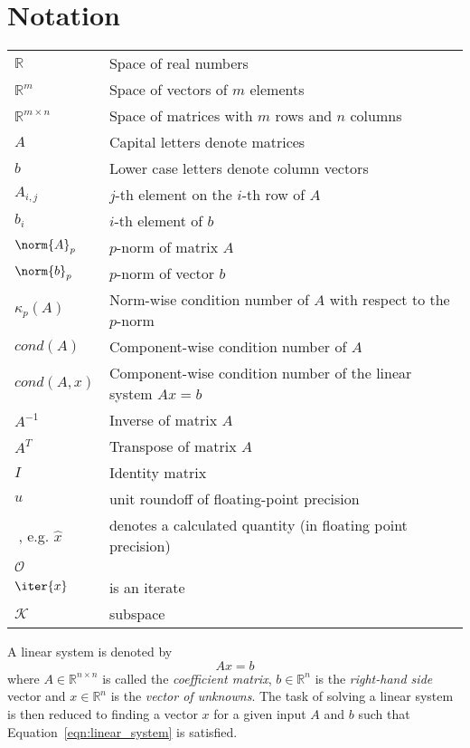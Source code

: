 \section{Notation}
\label{sec:notation}


\begin{tabular}{ll}
  $\mathbb{R}$ & Space of real numbers \\
  $\mathbb{R}^{m}$ & Space of vectors of $m$ elements \\
  $\mathbb{R}^{m \times n}$ & Space of matrices with $m$ rows and $n$ columns \\
  $A$ & Capital letters denote matrices \\
  $b$ & Lower case letters denote column vectors \\
  $A_{i,j}$ & $j$-th element on the $i$-th row of $A$ \\
  $b_{i}$ & $i$-th element of $b$ \\
  $\norm{A}_p$ & $p$-norm of matrix $A$ \\
  $\norm{b}_p$ & $p$-norm of vector $b$ \\
  $\kappa_{p}(A)$ & Norm-wise condition number of $A$ with respect to the $p$-norm \\
  $cond(A)$ & Component-wise condition number of $A$ \\
  $cond(A, x)$ & Component-wise condition number of the linear system $Ax=b$ \\
  $A^{-1}$ & Inverse of matrix $A$ \\
  $A^T$    & Transpose of matrix $A$ \\
  $I$      & Identity matrix  \\
  $u$      & unit roundoff of floating-point precision \\
  $\hat{}\;$, e.g. $\hat{x}$ & denotes a calculated quantity (in floating point precision) \\
  $\mathcal{O}$ & \\
  $\iter{x}$ & is an iterate \\
  $\mathcal{K}$ & subspace \\
\end{tabular}
\vspace{0.5cm}

\noindent A linear system is denoted by
\begin{equation}
\label{eqn:linear_system}
    Ax=b
\end{equation}
\noindent where $A \in \mathbb{R}^{n \times n}$ is called the \textit{coefficient matrix}, $b \in \mathbb{R}^{n}$ is the \textit{right-hand side} vector and $x \in \mathbb{R}^{n}$ is the \textit{vector of unknowns}. The task of solving a linear system is then reduced to finding a vector $x$ for a given input $A$ and $b$ such that Equation~\hyperref[eqn:linear_system]{\ref{eqn:linear_system}} is satisfied.

